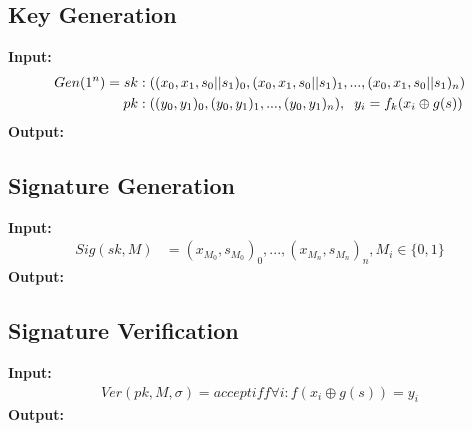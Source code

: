 \documentclass[]{scrartcl}
\makeatletter
\newcommand{\mathcenter}{\@fleqnfalse}
\makeatother
\begin{document}
\subsection*{Key Generation}
\textbf{Input:} 
\mathcenter
\begin{equation}
\begin{split}
Gen(1^n) = sk & : ((x_0, x_1, s_0||s_1)_0,(x_0, x_1, s_0||s_1)_1,...,(x_0, x_1, s_0||s_1)_n) \\
pk & : ((y_0, y_1)_0,(y_0, y_1)_1,...,(y_0, y_1)_n), \hspace{0.2cm} y_i = f_k(x_i \oplus g(s))
\end{split}
\end{equation}
\textbf{Output:} 

\subsection*{Signature Generation}
\textbf{Input:} 
\mathcenter
\begin{equation}
\begin{split}
Sig(sk, M) & = (x_{M_0}, s_{M_0})_0,...,(x_{M_n}, s_{M_n})_n, M_i \in \{0, 1\}
\end{split}
\end{equation}
\textbf{Output:} 

\subsection*{Signature Verification}
\textbf{Input:} 
\mathcenter
\begin{equation}
\begin{split}
Ver(pk, M, \sigma) =accept if f \forall i : f(x_i \oplus g(s)) = y_i 
\end{split}
\end{equation}
\textbf{Output:} 
\end{document}
